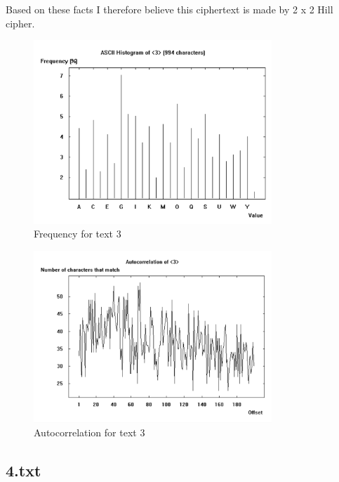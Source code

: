Based on these facts I therefore believe this ciphertext is made by 2 x 2 Hill cipher.

\begin{figure}[ht!]
    \begin{center}
        \includegraphics[width=0.8\textwidth]{assets/3_frequency.png}
        \caption{Frequency for text 3}
        \label{fig:3freq}
    \end{center}
\end{figure}

\begin{figure}[ht!]
    \begin{center}
        \includegraphics[width=0.8\textwidth]{assets/3_autocorr.png}
        \caption{Autocorrelation for text 3}
        \label{fig:3autocorr}
    \end{center}
\end{figure}

\newpage
\subsection*{4.txt}

